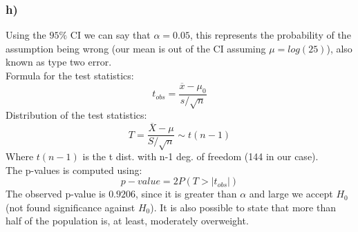 \subsubsection{h)}
Using the $95\%$ CI we can say that $\alpha = 0.05$, this represents the probability of the assumption being wrong (our mean is out of the CI assuming $\mu = log(25)$), also known as type two error. \\
Formula for the test statistics:
\[ t_{obs} = \frac{\overline{x}-\mu_0}{s/\sqrt{n}}\]
Distribution of the test statistics:
\[ T = \frac{\overline{X}-\mu}{S/\sqrt{n}} \sim t(n-1) \]
Where $t(n-1)$ is the t dist. with n-1 deg. of freedom (144 in our case). \\
The p-values is computed using:
\[  p-value = 2P(T>|t_{obs}|) \]
The observed p-value is $0.9206$, since it is greater than $\alpha$ and large we accept $H_0$ (not found significance against $H_0$). It is also possible to state that more than half of the population is, at least, moderately overweight.

